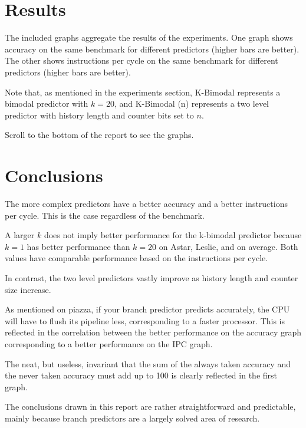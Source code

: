 \documentclass[9pt]{article}
\begin{document}
\section{Results}

The included graphs aggregate the results of the experiments. One graph shows accuracy on the same benchmark for different predictors (higher bars are better). The other shows instructions per cycle on the same benchmark for different predictors (higher bars are better). 

Note that, as mentioned in the experiments section, K-Bimodal represents a bimodal predictor with $k=20$, and K-Bimodal (n) represents a two level predictor with history length and counter bits set to $n$. 

Scroll to the bottom of the report to see the graphs. 

\section{Conclusions}

The more complex predictors have a better accuracy and a better instructions per cycle. This is the case regardless of the benchmark.

A larger $k$ does not imply better performance for the k-bimodal predictor because $k=1$ has better performance than $k=20$ on Astar, Leslie, and on average. Both values have comparable performance based on the instructions per cycle. 

In contrast, the two level predictors vastly improve as history length and counter size increase. 

As mentioned on piazza, if your branch predictor predicts accurately, the CPU will have to flush its pipeline less, corresponding to a faster processor. This is reflected in the correlation between the better performance on the accuracy graph corresponding to a better performance on the IPC graph. 

The neat, but useless, invariant that the sum of the always taken accuracy and the never taken accuracy must add up to 100 is clearly reflected in the first graph. 

The conclusions drawn in this report are rather straightforward and predictable, mainly because branch predictors are a largely solved area of research. 
 
\pagebreak
\end{document}
